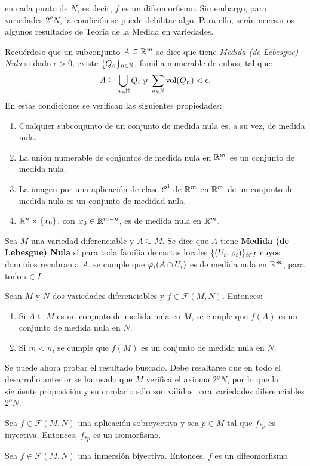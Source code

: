 \documentclass[Cursovd_portada.tex]{subfiles}
\begin{document}
en cada punto de $N$, es decir, $f$ es un difeomorfismo. Sin
embargo, para variedades $2^{\underline{o}}N$, la condición se
puede debilitar algo. Para ello, serán necesarios algunos
resultados de Teoría de la Medida en variedades.
\par
Recuérdese que un subconjunto $A\subseteq\mathbb{R}^m$ se dice que
tiene {\it Medida (de Lebesgue) Nula} si dado $\epsilon>0$, existe
$\{Q_n\}_{n\in\mathbb{N}}$, familia numerable de cubos, tal que:
$$A\subseteq\bigcup_{n\in\mathbb{N}}Q_i\mbox{ }y\mbox{ }\sum_{n\in\mathbb{N}}{\rm vol}(Q_n)<\epsilon.$$
\hs En estas condiciones se verifican las siguientes propiedades:
\begin{enumerate}
\item Cualquier subconjunto de un conjunto de medida nula es, a su
vez, de medida nula. \item La unión numerable de conjuntos de
medida nula en $\mathbb{R}^m$ es un conjunto de medida nula. \item La
imagen por una aplicación de clase $\mathcal{C}^1$ de $\mathbb{R}^m$
en $\mathbb{R}^m$ de un conjunto de medida nula es un conjunto de medidad
nula. \item $\mathbb{R}^n\times\{x_0\}$, con $x_0\in\mathbb{R}^{m-n}$, es de
medida nula en $\mathbb{R}^m$.
\end{enumerate}
\begin{defi}
Sea $M$ una variedad diferenciable y $A\subseteq M$. Se dice que
$A$ tiene {\bf Medida (de Lebesgue) Nula} si para toda familia de
cartas locales $\{(U_i,\varphi_i)\}_{i\in I}$ cuyos dominios recubran
a $A$, se cumple que $\varphi_i(A\cap U_i)$ es de medida nula en
$\mathbb{R}^m$, para todo $i\in I$.
\end{defi}
\begin{prop}
Sean $M$ y $N$ dos variedades diferenciables y
$f\in\mathcal{F}(M,N)$. Entonces:
\begin{enumerate}
\item Si $A\subseteq M$ es un conjunto de medida nula en $M$, se
cumple que $f(A)$ es un conjunto de medida nula en $N$. \item Si
$m<n$, se cumple que $f(M)$ es un conjunto de medida nula en $N$.
\end{enumerate}
\end{prop}
\hs Se puede ahora probar el resultado buscado. Debe resaltarse
que en todo el desarrollo anterior se ha usado que $M$ verifica el
axioma $2^{\underline{o}}N$, por lo que la si\-guien\-te
proposición y su corolario sólo son válidos para
variedades diferenciables $2^{\underline{o}}N$.
\begin{prop}
Sea $f\in\mathcal{F}(M,N)$ una aplicación sobreyectiva y sea
$p\in M$ tal que $f_{*p}$ es inyectiva. Entonces, $f_{*p}$ es un
isomorfismo.
\end{prop}
\begin{coro}
Sea $f\in\mathcal{F}(M,N)$ una inmersión biyectiva. Entonces,
$f$ es un difeomorfismo
\end{coro}
\end{document}
